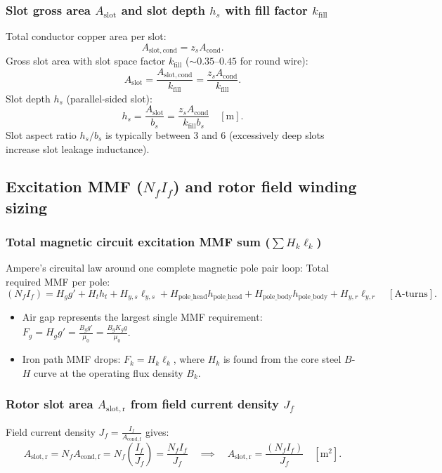 \subsubsection{Slot gross area $A_{\mathrm{slot}}$ and slot depth $h_s$ with fill factor $k_{\mathrm{fill}}$}
Total conductor copper area per slot:
\[
A_{\mathrm{slot,cond}} = z_s A_{\mathrm{cond}}.
\]
Gross slot area with slot space factor $k_{\mathrm{fill}}$ ($\sim 0.35\text{--}0.45$ for round wire):
\[
\boxed{A_{\mathrm{slot}} = \frac{A_{\mathrm{slot,cond}}}{k_{\mathrm{fill}}} = \frac{z_s A_{\mathrm{cond}}}{k_{\mathrm{fill}}}}.
\]
Slot depth $h_s$ (parallel-sided slot):
\[
\boxed{h_s = \frac{A_{\mathrm{slot}}}{b_s} = \frac{z_s A_{\mathrm{cond}}}{k_{\mathrm{fill}} b_s}}\quad[\mathrm{m}].
\]
Slot aspect ratio $h_s / b_s$ is typically between 3 and 6 (excessively deep slots increase slot leakage inductance).

\subsection{Excitation MMF ($N_f I_f$) and rotor field winding sizing}
\subsubsection{Total magnetic circuit excitation MMF sum ($\sum H_k \ell_k$)}
Ampere's circuital law around one complete magnetic pole pair loop:
Total required MMF per pole:
\[
\boxed{(N_f I_f) = H_g g' + H_t h_t + H_{y,s} \ell_{y,s} + H_{\mathrm{pole\_head}} h_{\mathrm{pole\_head}} + H_{\mathrm{pole\_body}} h_{\mathrm{pole\_body}} + H_{y,r} \ell_{y,r}}\quad[\mathrm{A\text{-}turns}].
\]
\begin{itemize}
  \item Air gap represents the largest single MMF requirement: $F_g = H_g g' = \frac{B_g g'}{\mu_0} = \frac{B_g K_g g}{\mu_0}$.
  \item Iron path MMF drops: $F_k = H_k \ell_k$, where $H_k$ is found from the core steel $B$-$H$ curve at the operating flux density $B_k$.
\end{itemize}

\subsubsection{Rotor slot area $A_{\mathrm{slot,r}}$ from field current density $J_f$}
Field current density $J_f = \frac{I_f}{A_{\mathrm{cond,f}}}$ gives:
\[
A_{\mathrm{slot,r}} = N_f A_{\mathrm{cond,f}} = N_f \left(\frac{I_f}{J_f}\right) = \frac{N_f I_f}{J_f}
\quad\implies\quad
\boxed{A_{\mathrm{slot,r}} = \frac{(N_f I_f)}{J_f}}\quad[\mathrm{m^2}].
\]


